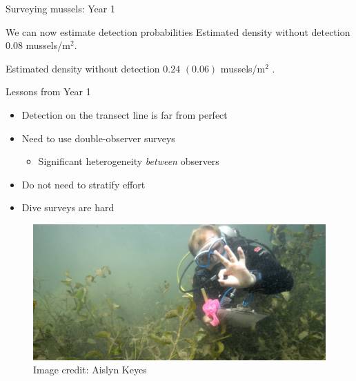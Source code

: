\documentclass[ignorenonframetext,]{beamer}
\providecommand{\tightlist}{%
  \setlength{\itemsep}{0pt}\setlength{\parskip}{0pt}}
\begin{document}
\begin{frame}{Surveying mussels: Year 1}
\begin{block}{We can now estimate detection probabilities}
Estimated density without detection \(0.08\) mussels/m\(^2\).

Estimated density without detection \(0.24\) \((0.06)\) mussels/m\(^2\)
.

\end{block}

\begin{block}{Lessons from Year 1}

\begin{itemize}
\tightlist
\item
  Detection on the transect line is far from perfect
\item
  Need to use double-observer surveys

  \begin{itemize}
  \tightlist
  \item
    Significant heterogeneity \emph{between} observers
  \end{itemize}
\item
  Do not need to stratify effort
\item
  Dive surveys are hard
\end{itemize}

\begin{figure}

{\centering \includegraphics[width=0.6\linewidth]{../Figures/AustenDistance} 

}

\caption{Image credit: Aislyn Keyes}\label{fig:unnamed-chunk-10}
\end{figure}

\end{block}

\end{frame}
\end{document}
